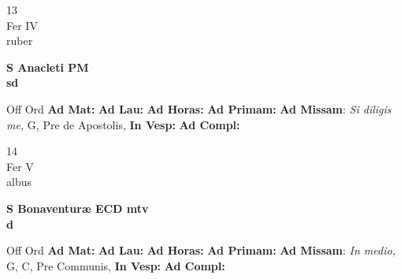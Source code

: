 \documentclass[10pt, openany]{book}
\begin{document}
    \begin{center}
        \begin{minipage}{3.5in}
            \vspace{2em}
            \begin{minipage}{0.5in}
                {\Huge 13} \\
                {\normalsize Fer IV} \\
                {\normalsize ruber}
            \end{minipage}
            \begin{minipage}{3.0in}
                \textbf{ \large S Anacleti PM \\
                \textnormal{\normalsize sd}} \\ 
            \end{minipage}
            \begin{justify}Off Ord
                \textbf{Ad Mat: }
                \textbf{Ad Lau: }
                \textbf{Ad Horas: }
                \textbf{Ad Primam: }\textbf{Ad Missam}: \textit{Si diligis me,} G, Pre de Apostolis,  
                \textbf{In Vesp: }
                \textbf{Ad Compl: }
            \end{justify}
        \end{minipage}
    \end{center}

    \begin{center}
        \begin{minipage}{3.5in}
            \vspace{2em}
            \begin{minipage}{0.5in}
                {\Huge 14} \\
                {\normalsize Fer V} \\
                {\normalsize albus}
            \end{minipage}
            \begin{minipage}{3.0in}
                \textbf{ \large S Bonaventuræ ECD mtv \\
                \textnormal{\normalsize d}} \\ 
            \end{minipage}
            \begin{justify}Off Ord
                \textbf{Ad Mat: }
                \textbf{Ad Lau: }
                \textbf{Ad Horas: }
                \textbf{Ad Primam: }\textbf{Ad Missam}: \textit{In medio,} G, C, Pre Communis,  
                \textbf{In Vesp: }
                \textbf{Ad Compl: }
            \end{justify}
        \end{minipage}
    \end{center}
\end{document}
